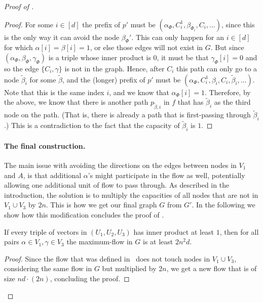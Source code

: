 \documentclass{toc}
\theoremstyle{plain}
\begin{document}
\begin{proof}[Proof of ]
\begin{proof}
For some $i\in [d]$ the prefix of $p'$ must be $(\alpha_{\Phi}, C_i^1, \beta_{\Phi_i}, C_i,...)$, since this is the only way it can avoid the node ${\beta_{\Phi}}'$.
This can only happen for an $i \in [d]$ for which $\alpha[i]=\beta[i]=1$, or else those edges will not exist in $G$.
But since $(\alpha_{\Phi}, \beta_{\Phi}, \gamma_{\Phi})$ is a triple whose inner product is $0$, it must be that $\gamma_{\Phi} [i]=0$ and so the edge $\{C_i,\gamma\}$ is not in the graph.
%
Hence, after $C_i$ this path can only go to a node $\widetilde{\beta}_i$ for some $\widetilde{\beta}$, and the (longer) prefix of $p'$ must be $(\alpha_{\Phi}, C_i^1, \beta_i, C_i, {\widetilde{\beta}}_i ,...)$.
Note that this is the same index $i$, and we know that $\alpha_{\Phi} [i] =1$.
Therefore, by the above, we know that there is another path $p_{\widetilde{\beta},i}$ in $f$ that has ${\widetilde{\beta}}_i$ as the third node on the path.
(That is, there is already a path that is first-passing through ${\widetilde{\beta}}_i$.)
This is a contradiction to the fact that the capacity of ${\widetilde{\beta}}_i$ is $1$.
\end{proof}


\paragraph{The final construction.}

The main issue with avoiding the directions on the edges between nodes in $V_1$ and $A$, is that additional $\alpha$'s might participate in the flow as well, potentially allowing one additional unit of flow to pass through. As described in the introduction, the solution is to multiply the capacities of all nodes that are not in $V_1\cup V_3$ by $2n$. This is how we get our final graph $G$ from $G'$.
In the following we show how this modification concludes the proof of .


\begin{claim}\label{claim:first}
If every triple of vectors in $(U_1, U_2, U_3)$ has inner product at least $1$, then for all pairs $\alpha \in V_1,\gamma \in V_3$ the maximum-flow in $G$ is at least $2n^2d$.
\end{claim}
\begin{proof}
Since the flow that was defined in~ does not touch nodes in $V_1\cup V_3$, considering the same flow in $G$ but multiplied by $2n$, we get a new flow that is of size $nd\cdot(2n)$, concluding the proof.
\end{proof}


\end{proof}
\end{document}
